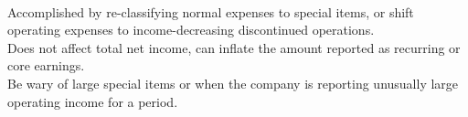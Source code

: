 \begin{definition} \\
Accomplished by re-classifying normal expenses to special items, or shift operating expenses to income-decreasing discontinued operations. \\
Does not affect total net income, can inflate the amount reported as recurring or core earnings.\\
Be wary of large special items or when the company is reporting unusually large operating income for a period. 
\end{definition}